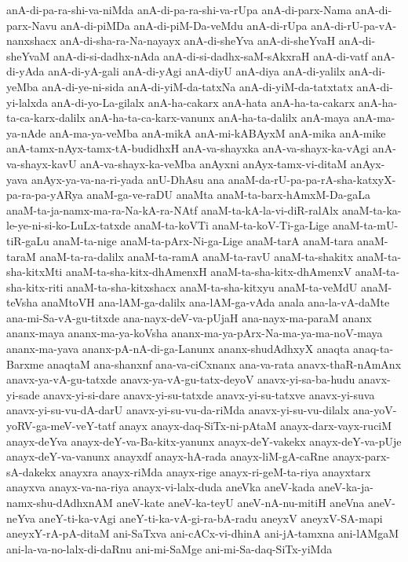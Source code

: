 {anA-di-pa-ra-shi-va-niMda
anA-di-pa-ra-shi-va-rUpa
anA-di-parx-Nama
anA-di-parx-Navu
anA-di-piMDa
anA-di-piM-Da-veMdu
anA-di-rUpa
anA-di-rU-pa-vA-nanxshacx
anA-di-sha-ra-Na-nayayx
anA-di-sheYva
anA-di-sheYvaH
anA-di-sheYvaM
anA-di-si-dadhx-nAda
anA-di-si-dadhx-saM-sAkxraH
anA-di-vatf
anA-di-yAda
anA-di-yA-gali
anA-di-yAgi
anA-diyU
anA-diya
anA-di-yalilx
anA-di-yeMba
anA-di-ye-ni-sida
anA-di-yiM-da-tatxNa
anA-di-yiM-da-tatxtatx
anA-di-yi-lalxda
anA-di-yo-La-gilalx
anA-ha-cakarx
anA-hata
anA-ha-ta-cakarx
anA-ha-ta-ca-karx-dalilx
anA-ha-ta-ca-karx-vanunx
anA-ha-ta-dalilx
anA-maya
anA-ma-ya-nAde
anA-ma-ya-veMba
anA-mikA
anA-mi-kABAyxM
anA-mika
anA-mike
anA-tamx-nAyx-tamx-tA-budidhxH
anA-va-shayxka
anA-va-shayx-ka-vAgi
anA-va-shayx-kavU
anA-va-shayx-ka-veMba
anAyxni
anAyx-tamx-vi-ditaM
anAyx-yava
anAyx-ya-va-na-ri-yada
anU-DhAsu
ana
anaM-da-rU-pa-pa-rA-sha-katxyX-pa-ra-pa-yARya
anaM-ga-ve-raDU
anaMta
anaM-ta-barx-hAmxM-Da-gaLa
anaM-ta-ja-namx-ma-ra-Na-kA-ra-NAtf
anaM-ta-kA-la-vi-diR-ralAlx
anaM-ta-ka-le-ye-ni-si-ko-LuLx-tatxde
anaM-ta-koVTi
anaM-ta-koV-Ti-ga-Lige
anaM-ta-mU-tiR-gaLu
anaM-ta-nige
anaM-ta-pArx-Ni-ga-Lige
anaM-tarA
anaM-tara
anaM-taraM
anaM-ta-ra-dalilx
anaM-ta-ramA
anaM-ta-ravU
anaM-ta-shakitx
anaM-ta-sha-kitxMti
anaM-ta-sha-kitx-dhAmenxH
anaM-ta-sha-kitx-dhAmenxV
anaM-ta-sha-kitx-riti
anaM-ta-sha-kitxshacx
anaM-ta-sha-kitxyu
anaM-ta-veMdU
anaM-teVsha
anaMtoVH
ana-lAM-ga-dalilx
ana-lAM-ga-vAda
anala
ana-la-vA-daMte
ana-mi-Sa-vA-gu-titxde
ana-nayx-deV-va-pUjaH
ana-nayx-ma-paraM
ananx
ananx-maya
ananx-ma-ya-koVsha
ananx-ma-ya-pArx-Na-ma-ya-ma-noV-maya
ananx-ma-yava
ananx-pA-nA-di-ga-Lanunx
ananx-shudAdhxyX
anaqta
anaq-ta-Barxme
anaqtaM
ana-shanxnf
ana-va-ciCxnanx
ana-va-rata
anavx-thaR-nAmAnx
anavx-ya-vA-gu-tatxde
anavx-ya-vA-gu-tatx-deyoV
anavx-yi-sa-ba-hudu
anavx-yi-sade
anavx-yi-si-dare
anavx-yi-su-tatxde
anavx-yi-su-tatxve
anavx-yi-suva
anavx-yi-su-vu-dA-darU
anavx-yi-su-vu-da-riMda
anavx-yi-su-vu-dilalx
ana-yoV-yoRV-ga-meV-veY-tatf
anayx
anayx-daq-SiTx-ni-pAtaM
anayx-darx-vayx-ruciM
anayx-deYva
anayx-deY-va-Ba-kitx-yanunx
anayx-deY-vakekx
anayx-deY-va-pUje
anayx-deY-va-vanunx
anayxdf
anayx-hA-rada
anayx-liM-gA-caRne
anayx-parx-sA-dakekx
anayxra
anayx-riMda
anayx-rige
anayx-ri-geM-ta-riya
anayxtarx
anayxva
anayx-va-na-riya
anayx-vi-lalx-duda
aneVka
aneV-kada
aneV-ka-ja-namx-shu-dAdhxnAM
aneV-kate
aneV-ka-teyU
aneV-nA-nu-mitiH
aneVna
aneV-neYva
aneY-ti-ka-vAgi
aneY-ti-ka-vA-gi-ra-bA-radu
aneyxV
aneyxV-SA-mapi
aneyxY-rA-pA-ditaM
ani-SaTxva
ani-cACx-vi-dhinA
ani-jA-tamxna
ani-lAMgaM
ani-la-va-no-lalx-di-daRnu
ani-mi-SaMge
ani-mi-Sa-daq-SiTx-yiMda
}
